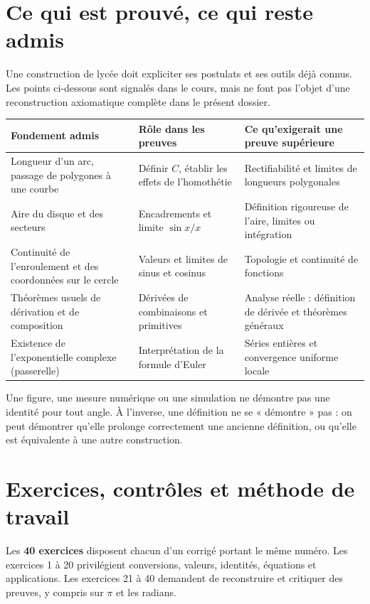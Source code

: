 \documentclass[11pt,a4paper,oneside]{book}
\begin{document}
\chapter{Ce qui est prouvé, ce qui reste admis}
Une construction de lycée doit expliciter ses postulats et ses outils déjà connus. Les points ci-dessous sont signalés dans le cours, mais ne font pas l'objet d'une reconstruction axiomatique complète dans le présent dossier.
\begin{longtable}{p{}p{}p{}}
\toprule
\textbf{Fondement admis} & \textbf{Rôle dans les preuves} & \textbf{Ce qu'exigerait une preuve supérieure}\\\midrule
Longueur d'un arc, passage de polygones à une courbe & Définir $C$, établir les effets de l'homothétie & Rectifiabilité et limites de longueurs polygonales\\
Aire du disque et des secteurs & Encadrements et limite $\sin x/x$ & Définition rigoureuse de l'aire, limites ou intégration\\
Continuité de l'enroulement et des coordonnées sur le cercle & Valeurs et limites de sinus et cosinus & Topologie et continuité de fonctions\\
Théorèmes usuels de dérivation et de composition & Dérivées de combinaisons et primitives & Analyse réelle : définition de dérivée et théorèmes généraux\\
Existence de l'exponentielle complexe (passerelle) & Interprétation de la formule d'Euler & Séries entières et convergence uniforme locale\\
\bottomrule
\end{longtable}
\begin{attention}
Une figure, une mesure numérique ou une simulation ne démontre pas une identité pour tout angle. À l'inverse, une définition ne se « démontre » pas : on peut démontrer qu'elle prolonge correctement une ancienne définition, ou qu'elle est équivalente à une autre construction.
\end{attention}
\chapter{Exercices, contrôles et méthode de travail}
Les \textbf{40 exercices} disposent chacun d'un corrigé portant le même numéro. Les exercices 1 à 20 privilégient conversions, valeurs, identités, équations et applications. Les exercices 21 à 40 demandent de reconstruire et critiquer des preuves, y compris sur $\pi$ et les radians.
\end{document}
